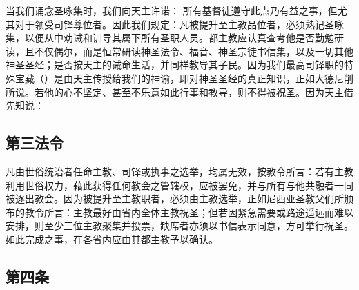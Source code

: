 \par

当我们诵念圣咏集时，我们向天主许诺： 所有基督徒遵守此点乃有益之事，但尤其对于领受司铎尊位者。因此我们规定：凡被提升至主教品位者，必须熟记圣咏集，以便从中劝诫和训导其属下所有圣职人员。都主教应认真查考他是否勤勉研读，且不仅偶尔，而是恒常研读神圣法令、福音、神圣宗徒书信集，以及一切其他神圣圣经；是否按天主的诫命生活，并同样教导其子民。因为我们最高司铎职的特殊宝藏（）是由天主传授给我们的神谕，即对神圣圣经的真正知识，正如大德尼削所说。若他的心不坚定、甚至不乐意如此行事和教导，则不得被祝圣。因为天主借先知说：\par

\par


\subsection{第三法令}

\par

凡由世俗统治者任命主教、司铎或执事之选举，均属无效，按教令所言：若有主教利用世俗权力，藉此获得任何教会之管辖权，应被罢免，并与所有与他共融者一同被逐出教会。因为被提升至主教职者，必须由主教选举，正如尼西亚圣教父们所颁布的教令所言：主教最好由省内全体主教祝圣；但若因紧急需要或路途遥远而难以安排，则至少三位主教聚集并投票，缺席者亦须以书信表示同意，方可举行祝圣。如此完成之事，在各省内应由其都主教予以确认。\par

\par


\subsection{第四条}

\par

